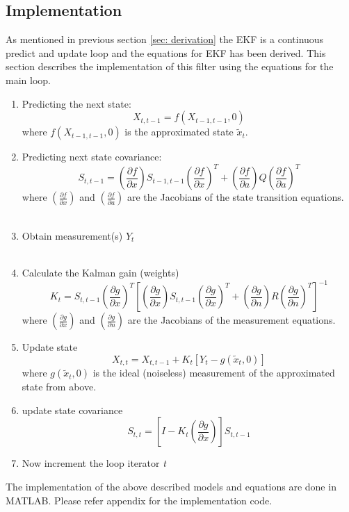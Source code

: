 \documentclass[12pt]{article}
\begin{document}
\subsection{Implementation}
As mentioned in previous section \ref{sec: derivation}  the EKF is a continuous predict and update loop and the equations for EKF has been derived. This section describes the implementation of this filter using the equations for the main loop.  \\
\begin{enumerate}
\item Predicting the next state: 
\begin{equation}
X_{t,t-1} = f(X_{t-1,t-1},0)
\label{eq:Xnext}
\end{equation}
where $f(X_{t-1,t-1},0)$ is the approximated state $\tilde{x}_t$. \\
\item Predicting next state covariance: 
\begin{equation}
S_{t,t-1} =
\left( \frac{\partial f}{\partial x} \right)
S_{t-1,t-1} \left(\frac{\partial f}{\partial x}\right)^T
+ \left( \frac{\partial f}{\partial a} \right) Q
\left(\frac{\partial f}{\partial a}\right)^T
\end{equation}
where $\left(\frac{\partial f}{\partial x}\right)$ and $\left(\frac{\partial f}{\partial a}\right)$ are the Jacobians of the state transition equations. \\
\\
\item Obtain measurement(s) $Y_t$ \\
\\
\item Calculate the Kalman gain (weights)
\begin{equation}
K_t = S_{t,t-1} 
\left( \frac{\partial g}{\partial x} \right)^T
\left[
\left( \frac{\partial g}{\partial x} \right)
S_{t,t-1}
\left( \frac{\partial g}{\partial x} \right)^T
+
\left( \frac{\partial g}{\partial n} \right)
R
\left( \frac{\partial g}{\partial n} \right)^T
\right]^{-1}
\end{equation}
where $\left(\frac{\partial g}{\partial x}\right)$ and $\left(\frac{\partial g}{\partial n}\right)$ are the Jacobians of the measurement equations.

\item Update state
\begin{equation}
X_{t,t} = X_{t,t-1} + K_t [Y_t - g(\tilde{x}_t,0)]
\end{equation}
where $g(\tilde{x}_t,0)$ is the ideal (noiseless) measurement of the approximated state from above.

\item update state covariance
\begin{equation}
S_{t,t} = \left[ I - K_t
\left( \frac{\partial g}{\partial x} \right) \right] S_{t,t-1}
\end{equation}

\item Now increment the loop iterator \textit{t}

\end{enumerate}
The implementation of the above described models and equations are done in MATLAB. Please refer appendix for the implementation code. 
\end{document}
